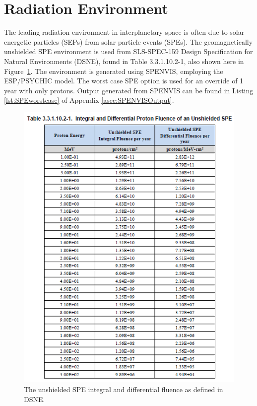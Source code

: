\documentclass{hitec}
\begin{document}
\section{Radiation Environment}

The leading radiation environment in interplanetary space is often due to solar energetic particles (SEPs) from solar particle events (SPEs). The geomagnetically unshielded SPE environment is used from SLS-SPEC-159 Design Specification for Natural Environments (DSNE), found in Table 3.3.1.10.2-1, also shown here in Figure~\ref{fig:DSNE_UnshieldedSPEFlux}. The environment is generated using SPENVIS, employing the ESP/PSYCHIC model. The worst case SPE option is used for an override of 1 year with only protons. Output generated from SPENVIS can be found in Listing \ref{lst:SPEworstcase} of Appendix \ref{asec:SPENVISOutput}.

\begin{figure}[h!]
	\centering
	\includegraphics[scale=1.0]{DSNE_3.3.1.10.2-1.png}
	\caption{The unshielded SPE integral and differential fluence as defined in DSNE.}\label{fig:DSNE_UnshieldedSPEFlux}
\end{figure}
\end{document}
